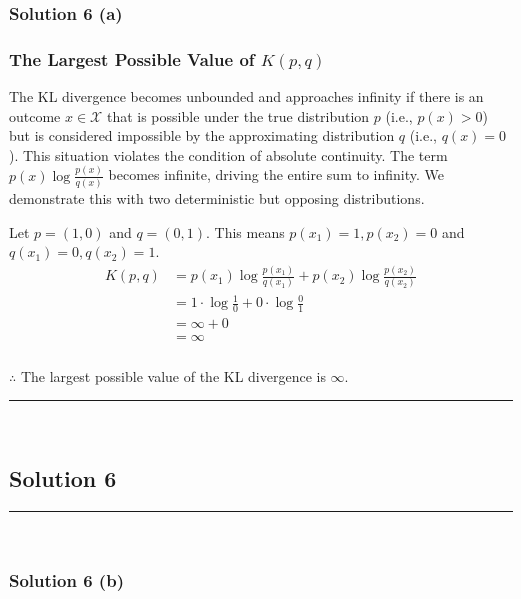 \documentclass{article}
\begin{document}
\subsubsection*{Solution 6 (a)}

\subsubsection*{The Largest Possible Value of $K(p, q)$}
\parbox{\textwidth}{
The KL divergence becomes unbounded and approaches infinity if there is an outcome $x \in \mathcal{X}$ that is possible under the true distribution $p$ (i.e., $p(x) > 0$) but is considered impossible by the approximating distribution $q$ (i.e., $q(x) = 0$). This situation violates the condition of absolute continuity. The term $p(x) \log \frac{p(x)}{q(x)}$ becomes infinite, driving the entire sum to infinity. We demonstrate this with two deterministic but opposing distributions.
}
\parbox{\textwidth}{
Let $p=(1, 0)$ and $q=(0, 1)$. This means $p(x_1)=1, p(x_2)=0$ and $q(x_1)=0, q(x_2)=1$.
\begin{align*}
    K(p, q) &= p(x_1) \log\frac{p(x_1)}{q(x_1)} + p(x_2) \log\frac{p(x_2)}{q(x_2)} \\
    &= 1 \cdot \log\frac{1}{0} + 0 \cdot \log\frac{0}{1} \\
    &= \infty + 0 \\
    &= \infty
\end{align*}
}
\subsubsection*{\normalfont}{$\therefore$ The largest possible value of the KL divergence is $\infty$.}


\noindent\rule{\textwidth}{0.4pt}\\

\newpage

\subsection*{Solution 6}
\noindent\rule{\textwidth}{0.4pt}\\
\subsubsection*{Solution 6 (b)}
\end{document}
